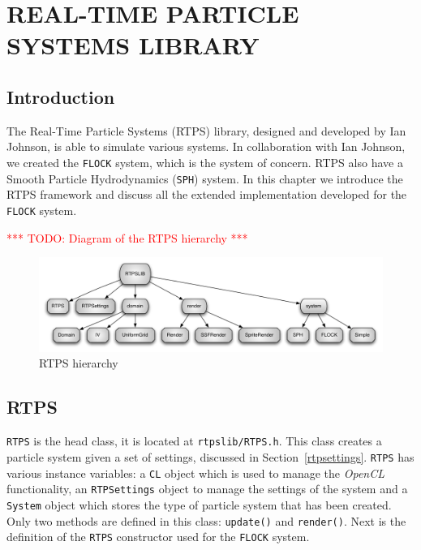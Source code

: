 \chapter{REAL-TIME PARTICLE SYSTEMS LIBRARY}\label{RTPSchapter}

\section{Introduction}
The Real-Time Particle Systems (RTPS) library, designed and developed by Ian Johnson\cite{ianPaper}, is able to simulate various systems. In collaboration with Ian Johnson, we created the \texttt{FLOCK} system, which is the system of concern. RTPS also have a Smooth Particle Hydrodynamics (\texttt{SPH}) system. In this chapter we introduce the RTPS framework and discuss all the extended implementation developed for the \texttt{FLOCK} system. 

\textcolor{red}{*** TODO: Diagram of the RTPS hierarchy ***}
\begin{figure}[htbp]
\begin{center}
\includegraphics[scale=0.5]{figures/RTPSdiagram.pdf}
\caption{RTPS hierarchy}
\label{RTPSdiagram}
\end{center}
\end{figure}



\section{RTPS}
\texttt{RTPS} is the head class, it is located at \texttt{rtpslib/RTPS.h}. This class creates a particle system given a set of settings, discussed in Section~\ref{rtpsettings}. \texttt{RTPS} has various instance variables: a \texttt{CL} object which is used to manage the \textit{OpenCL} functionality,  an \texttt{RTPSettings} object to manage the settings of the system and a \texttt{System} object which stores the type of particle system that has been created. Only two methods are defined in this class: \texttt{update()} and \texttt{render()}. Next is the definition of the \texttt{RTPS} constructor used for the \texttt{FLOCK} system.

